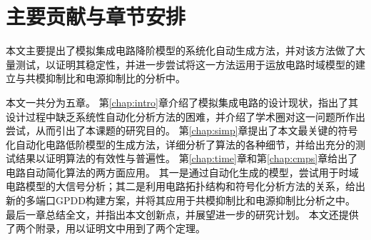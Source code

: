 \section{主要贡献与章节安排}
\label{sec:intro:org}

本文主要提出了模拟集成电路降阶模型的系统化自动生成方法，并对该方法做了大量测试，以证明其稳定性，并进一步尝试将这一方法运用于运放电路时域模型的建立与共模抑制比和电源抑制比的分析中。

本文一共分为五章。
第\ref{chap:intro}章介绍了模拟集成电路的设计现状，指出了其设计过程中缺乏系统性自动化分析方法的困难，并介绍了学术圈对这一问题所作出尝试，从而引出了本课题的研究目的。
第\ref{chap:simp}章提出了本文最关键的符号化自动化电路低阶模型的生成方法，详细分析了算法的各种细节，并给出充分的测试结果以证明算法的有效性与普遍性。
第\ref{chap:time}章和第\ref{chap:cmps}章给出了电路自动简化算法的两方面应用。
其一是通过自动化生成的模型，尝试用于时域电路模型的大信号分析；其二是利用电路拓扑结构和符号化分析方法的关系，给出新的多端口GPDD构建方案，并将其应用于共模抑制比和电源抑制比分析之中。
最后一章总结全文，并指出本文创新点，并展望进一步的研究计划。
本文还提供了两个附录，用以证明文中用到了两个定理。